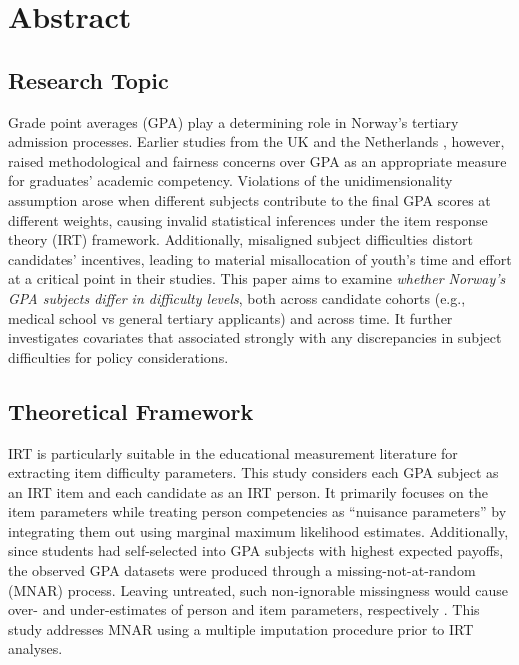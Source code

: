 \section{Abstract}


\subsection{Research Topic}

Grade point averages (GPA) play a determining role in Norway's tertiary admission processes. Earlier studies from the UK \parencite{he:2018} and the Netherlands \parencite{korobko:2008}, however, raised methodological and fairness concerns over GPA as an appropriate measure for graduates' academic competency. Violations of the unidimensionality assumption arose when different subjects contribute to the final GPA scores at different weights, causing invalid statistical inferences under the item response theory (IRT) framework. Additionally, misaligned subject difficulties distort candidates' incentives, leading to material misallocation of youth's time and effort at a critical point in their studies. This paper aims to examine \emph{whether Norway's GPA subjects differ in difficulty levels}, both across candidate cohorts (e.g., medical school vs general tertiary applicants) and across time. It further investigates covariates that associated strongly with any discrepancies in subject difficulties for policy considerations.

\subsection{Theoretical Framework}

IRT is particularly suitable in the educational measurement literature for extracting item difficulty parameters. This study considers each GPA subject as an IRT item and each candidate as an IRT person. It primarily focuses on the item parameters while treating person competencies as ``nuisance parameters'' by integrating them out using marginal maximum likelihood estimates. Additionally, since students had self-selected into GPA subjects with highest expected payoffs, the observed GPA datasets were produced through a missing-not-at-random (MNAR) process. Leaving untreated, such non-ignorable missingness would cause over- and under-estimates of person and item parameters, respectively \parencite{rose:2013}. This study addresses MNAR using a multiple imputation procedure prior to IRT analyses.

